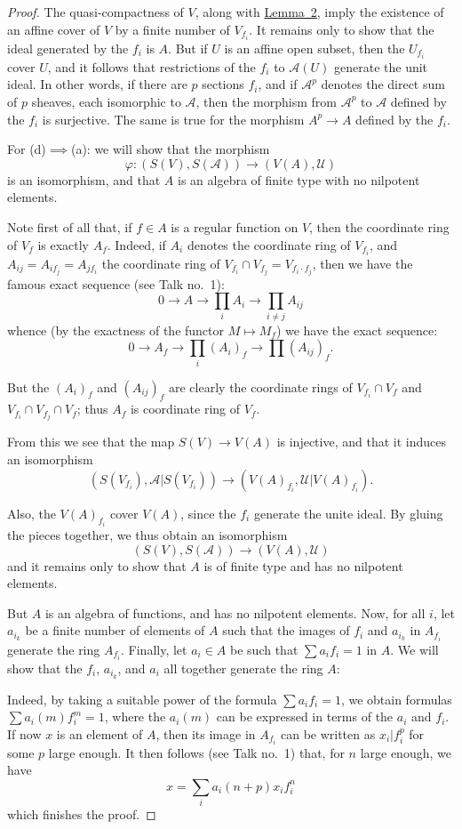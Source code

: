 \documentclass{article}
\newcommand{\scr}[1]{{\mathscr{#1}}}
\newcommand{\oldpage}[1]{\marginpar{\footnotesize$\Big\vert$ \textit{p.~#1}}}
\begin{document}
\begin{proof}
  The quasi-compactness of $V$, along with \hyperref[lemma2]{Lemma~2}, imply the existence of an affine cover of $V$ by a finite number of $V_{f_i}$.
  It remains only to show that the ideal generated by the $f_i$ is $A$.
  But if $U$ is an affine open subset, then the $U_{f_i}$ cover $U$, and it follows that restrictions of the $f_i$ to $\scr{A}(U)$ generate the unit ideal.
  In other words, if there are $p$ sections $f_i$, and if $\scr{A}^p$ denotes the direct sum of $p$ sheaves, each isomorphic to $\scr{A}$, then the morphism from $\scr{A}^p$ to $\scr{A}$ defined by the $f_i$ is surjective.
  The same is true for the morphism $A^p\to A$ defined by the $f_i$.

  \bigskip

  For (d)$\implies$(a):
  we will show that the morphism
  \[
    \varphi\colon (S(V),S(\scr{A})) \to (V(A),\scr{U})
  \]
  is an isomorphism, and that $A$ is an algebra of finite type with no nilpotent elements.

  Note first of all that, if $f\in A$ is a regular function on $V$, then the coordinate ring of $V_f$ is exactly $A_f$.
  Indeed, if $A_i$ denotes the coordinate ring of $V_{f_i}$, and $A_{ij}=A_{if_j}=A_{jf_i}$ the coordinate ring of $V_{f_i}\cap V_{f_j}=V_{f_i\cdot f_j}$, then we have the famous exact sequence (see Talk no.~1):
  \[
    0 \to A \to \prod_i A_i \to \prod_{i\neq j}A_{ij}
  \]
  whence (by the exactness of the functor $M\mapsto M_f$) we have the exact sequence:
  \[
    0 \to A_f \to \prod_i(A_i)_f \to \prod(A_{ij})_f.
  \]

  But the $(A_i)_f$ and $(A_{ij})_f$ are clearly the coordinate rings of
\oldpage{2-07}
  $V_{f_i}\cap V_f$ and $V_{f_i}\cap V_{f_j}\cap V_f$;
  thus $A_f$ is coordinate ring of $V_f$.

  From this we see that the map $S(V)\to V(A)$ is injective, and that it induces an isomorphism
  \[
    (S(V_{f_i}), \scr{A}|S(V_{f_i})) \to (V(A)_{f_i}, \scr{U}|V(A)_{f_i}).
  \]

  Also, the $V(A)_{f_i}$ cover $V(A)$, since the $f_i$ generate the unite ideal.
  By gluing the pieces together, we thus obtain an isomorphism
  \[
    (S(V),S(\scr{A})) \to (V(A),\scr{U})
  \]
  and it remains only to show that $A$ is of finite type and has no nilpotent elements.

  But $A$ is an algebra of functions, and has no nilpotent elements.
  Now, for all $i$, let $a_{i_k}$ be a finite number of elements of $A$ such that the images of $f_i$ and $a_{i_k}$ in $A_{f_i}$ generate the ring $A_{f_i}$.
  Finally, let $a_i\in A$ be such that $\sum a_i f_i=1$ in $A$.
  We will show that the $f_i$, $a_{i_k}$, and $a_i$ all together generate the ring $A$:

  Indeed, by taking a suitable power of the formula $\sum a_i f_i=1$, we obtain formulas $\sum a_i(m)f_i^m=1$, where the $a_i(m)$ can be expressed in terms of the $a_i$ and $f_i$.
  If now $x$ is an element of $A$, then its image in $A_{f_i}$ can be written as $x_i|f_i^p$ for some $p$ large enough.
  It then follows (see Talk no.~1) that, for $n$ large enough, we have
  \[
    x = \sum_i a_i(n+p) x_i f_i^n
  \]
  which finishes the proof.
\end{proof}
\end{document}
